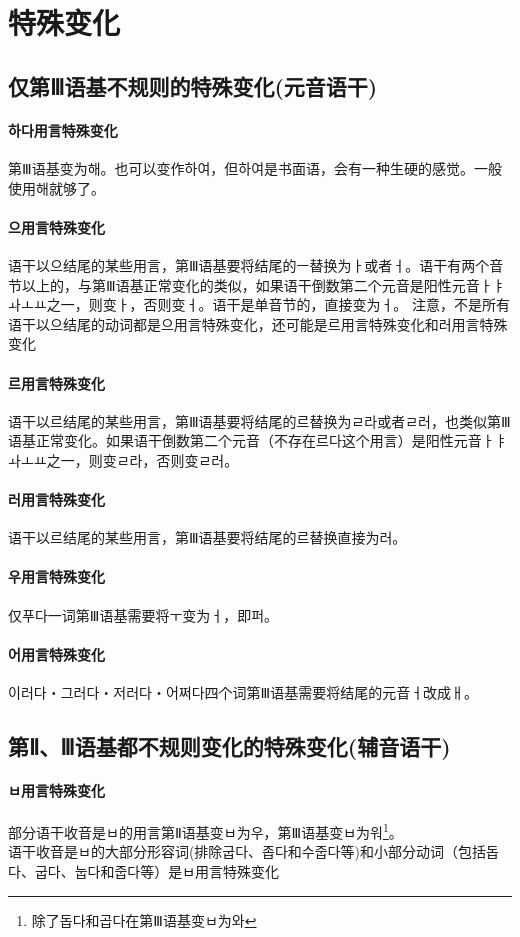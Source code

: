 \section{特殊变化}\label{eogi:bk}
\subsection{仅第Ⅲ语基不规则的特殊变化(元音语干)}
\paragraph{하다用言特殊变化}\label{eogi:hata}
第Ⅲ语基变为해。也可以变作하여，但하여是书面语，会有一种生硬的感觉。一般使用해就够了。
\paragraph{으用言特殊变化}\label{eogi:eu}
语干以으结尾的某些用言，第Ⅲ语基要将结尾的ㅡ替换为ㅏ或者ㅓ。语干有两个音节以上的，与第Ⅲ语基正常变化的类似，如果语干倒数第二个元音是阳性元音{\kr ㅏㅑㅘㅗㅛ}之一，则变ㅏ，否则变ㅓ。语干是单音节的，直接变为ㅓ。{\color{red} 注意，不是所有语干以으结尾的动词都是으用言特殊变化，还可能是르用言特殊变化和러用言特殊变化} 
\paragraph{르用言特殊变化}%
语干以르结尾的某些用言，第Ⅲ语基要将结尾的르替换为ㄹ라或者ㄹ러，也类似第Ⅲ语基正常变化。如果语干倒数第二个元音（不存在르다这个用言）是阳性元音{\kr ㅏㅑㅘㅗㅛ}之一，则变ㄹ라，否则变ㄹ러。
\paragraph{러用言特殊变化}%
语干以르结尾的某些用言，第Ⅲ语基要将结尾的르替换直接为러。
\paragraph{우用言特殊变化}\label{eogi:u}
仅푸다一词第Ⅲ语基需要将ㅜ变为ㅓ，即퍼。
\paragraph{어用言特殊变化}\label{eogi:eo}
이러다・그러다・저러다・어쩌다四个词第Ⅲ语基需要将结尾的元音ㅓ改成ㅐ。
\subsection{第Ⅱ、Ⅲ语基都不规则变化的特殊变化(辅音语干)}
\paragraph{ㅂ用言特殊变化}
部分语干收音是ㅂ的用言第Ⅱ语基变ㅂ为우，第Ⅲ语基变ㅂ为워\footnote{除了돕다和곱다在第Ⅲ语基变ㅂ为와}。
\\语干收音是ㅂ的大部分形容词(排除굽다、좁다和수줍다等)和小部分动词（包括돕다、굽다、눕다和줍다等）是ㅂ用言特殊变化
